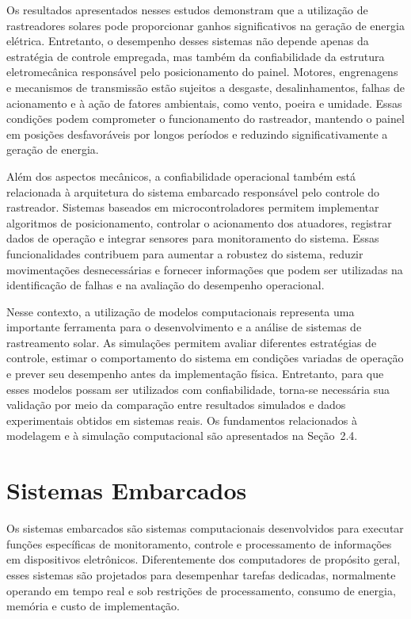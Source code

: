 Os resultados apresentados nesses estudos demonstram que a utilização de rastreadores solares pode proporcionar ganhos significativos na geração de energia elétrica. Entretanto, o desempenho desses sistemas não depende apenas da estratégia de controle empregada, mas também da confiabilidade da estrutura eletromecânica responsável pelo posicionamento do painel. Motores, engrenagens e mecanismos de transmissão estão sujeitos a desgaste, desalinhamentos, falhas de acionamento e à ação de fatores ambientais, como vento, poeira e umidade. Essas condições podem comprometer o funcionamento do rastreador, mantendo o painel em posições desfavoráveis por longos períodos e reduzindo significativamente a geração de energia.

Além dos aspectos mecânicos, a confiabilidade operacional também está relacionada à arquitetura do sistema embarcado responsável pelo controle do rastreador. Sistemas baseados em microcontroladores permitem implementar algoritmos de posicionamento, controlar o acionamento dos atuadores, registrar dados de operação e integrar sensores para monitoramento do sistema. Essas funcionalidades contribuem para aumentar a robustez do sistema, reduzir movimentações desnecessárias e fornecer informações que podem ser utilizadas na identificação de falhas e na avaliação do desempenho operacional.

Nesse contexto, a utilização de modelos computacionais representa uma importante ferramenta para o desenvolvimento e a análise de sistemas de rastreamento solar. As simulações permitem avaliar diferentes estratégias de controle, estimar o comportamento do sistema em condições variadas de operação e prever seu desempenho antes da implementação física. Entretanto, para que esses modelos possam ser utilizados com confiabilidade, torna-se necessária sua validação por meio da comparação entre resultados simulados e dados experimentais obtidos em sistemas reais. Os fundamentos relacionados à modelagem e à simulação computacional são apresentados na Seção~2.4.

\section{Sistemas Embarcados}


Os sistemas embarcados são sistemas computacionais desenvolvidos para executar funções específicas de monitoramento, controle e processamento de informações em dispositivos eletrônicos. Diferentemente dos computadores de propósito geral, esses sistemas são projetados para desempenhar tarefas dedicadas, normalmente operando em tempo real e sob restrições de processamento, consumo de energia, memória e custo de implementação.

